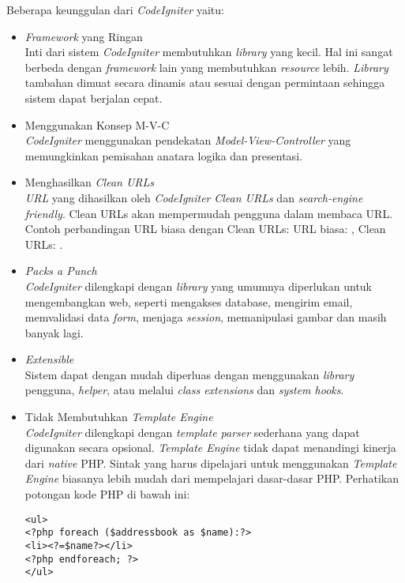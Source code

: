 Beberapa keunggulan dari \textit{CodeIgniter} yaitu:
\begin{itemize}
	\item \textit{Framework} yang Ringan \\
		Inti dari sistem \textit{CodeIgniter} membutuhkan \textit{library} yang kecil. Hal ini sangat berbeda dengan \textit{framework} lain yang membutuhkan \textit{resource} lebih. \textit{Library} tambahan dimuat secara dinamis atau sesuai dengan permintaan sehingga sistem dapat berjalan cepat.
	\item Menggunakan Konsep M-V-C \\
		\textit{CodeIgniter} menggunakan pendekatan \textit{Model-View-Controller} yang memungkinkan pemisahan anatara logika dan presentasi.
	\item Menghasilkan \textit{Clean URLs} \\
		\textit{URL} yang dihasilkan oleh \textit{CodeIgniter} \textit{Clean URLs} dan \textit{search-engine friendly}. Clean URLs akan mempermudah pengguna dalam membaca URL. Contoh perbandingan URL biasa dengan Clean URLs: URL biasa: , Clean URLs: .
	\item \textit{Packs a Punch} \\
		\textit{CodeIgniter} dilengkapi dengan \textit{library} yang umumnya diperlukan untuk mengembangkan web, seperti mengakses database, mengirim email, memvalidasi data \textit{form}, menjaga \textit{session}, memanipulasi gambar dan masih banyak lagi.
	\item \textit{Extensible} \\
		Sistem dapat dengan mudah diperluas dengan menggunakan \textit{library} pengguna, \textit{helper}, atau melalui \textit{class extensions} dan \textit{system hooks}.
	\item Tidak Membutuhkan \textit{Template Engine} \\
		\textit{CodeIgniter} dilengkapi dengan \textit{template parser} sederhana yang dapat digunakan secara opsional. \textit{Template Engine} tidak dapat menandingi kinerja dari \textit{native} PHP. Sintak yang harus dipelajari untuk menggunakan \textit{Template Engine} biasanya lebih mudah dari mempelajari dasar-dasar PHP. Perhatikan potongan kode PHP di bawah ini: \\
		\begin{lstlisting}[basicstyle=\ttfamily, frame=single,
		columns=fullflexible, keepspaces=true, breaklines=true]
<ul>
<?php foreach ($addressbook as $name):?>
<li><?=$name?></li>
<?php endforeach; ?>
</ul>
\end{lstlisting}
		

\end{itemize}
